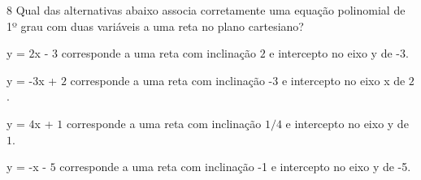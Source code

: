

\num{8}  Qual das alternativas abaixo associa corretamente uma equação
polinomial de 1º grau com duas variáveis a uma reta no plano cartesiano?

\begin{escolha}
\item y = $2$x - $3$ corresponde a uma reta com inclinação $2$ e intercepto no
eixo y de -3.
\item y = -3x + $2$ corresponde a uma reta com inclinação -3 e intercepto no
eixo x de $2$.
\item y = $4$x + $1$ corresponde a uma reta com inclinação $1/4$ e intercepto no
eixo y de $1$.
\item y = -x - $5$ corresponde a uma reta com inclinação -1 e intercepto no
eixo y de -5.
\end{escolha}



